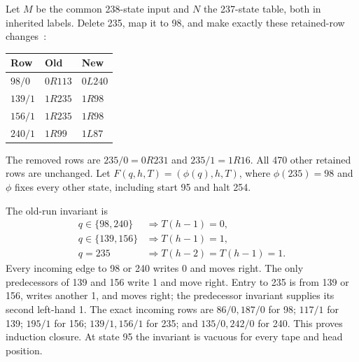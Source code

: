 Let $M$ be the common 238-state input and $N$ the 237-state table,
both in inherited labels.  Delete 235, map it to 98, and make exactly
these retained-row changes~\cite{parent237}:
\begin{center}
\begin{tabular}{@{}lll@{}}
\toprule
Row & Old & New\\
\midrule
$98/0$ & $0R113$ & $0L240$\\
$139/1$ & $1R235$ & $1R98$\\
$156/1$ & $1R235$ & $1R98$\\
$240/1$ & $1R99$ & $1L87$\\
\bottomrule
\end{tabular}
\end{center}
The removed rows are $235/0=0R231$ and $235/1=1R16$.
All 470 other retained rows are unchanged.  Let
$F(q,h,T)=(\phi(q),h,T)$, where $\phi(235)=98$ and $\phi$
fixes every other state, including start 95 and halt 254.

The old-run invariant is
\begin{align*}
 q\in\{98,240\}&\Longrightarrow T(h-1)=0,\\
 q\in\{139,156\}&\Longrightarrow T(h-1)=1,\\
 q=235&\Longrightarrow T(h-2)=T(h-1)=1.
\end{align*}
Every incoming edge to 98 or 240 writes 0 and moves right.  The
only predecessors of 139 and 156 write 1 and move right.  Entry
to 235 is from 139 or 156, writes another 1, and moves right;
the predecessor invariant supplies its second left-hand 1.
The exact incoming rows are $86/0,187/0$ for 98;
$117/1$ for 139; $195/1$ for 156; $139/1,156/1$ for 235;
and $135/0,242/0$ for 240.  This proves induction closure.
At state 95 the invariant is vacuous for every tape and head position.

